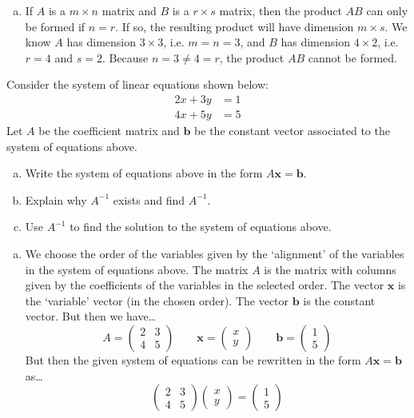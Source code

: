 \documentclass[12pt,letterpaper]{exam}
\begin{document}
\begin{questions}
\begin{enumerate}[(a)]
\item If $A$ is a $m \times n$ matrix and $B$ is a $r \times s$ matrix, then the product $AB$ can only be formed if $n= r$. If so, the resulting product will have dimension $m \times s$. We know $A$ has dimension $3 \times 3$, i.e. $m= n= 3$, and $B$ has dimension $4 \times 2$, i.e. $r= 4$ and $s= 2$. Because $n= 3 \neq 4= r$, the product $AB$ cannot be formed. 
\end{enumerate}



\newpage
\question[10] Consider the system of linear equations shown below:
	\[
	\begin{aligned}
	2x + 3y&= 1 \\
	4x + 5y&= 5
	\end{aligned}
	\]
Let $A$ be the coefficient matrix and $\mathbf{b}$ be the constant vector associated to the system of equations above. 
        \begin{enumerate}[(a)]
        \item Write the system of equations above in the form $A\mathbf{x}= \mathbf{b}$. 
        \item Explain why $A^{-1}$ exists and find $A^{-1}$. 
        \item Use $A^{-1}$ to find the solution to the system of equations above. 
        \end{enumerate} \par\vspace{0.2cm}

\sol 
\begin{enumerate}[(a)]
\item We choose the order of the variables given by the `alignment' of the variables in the system of equations above. The matrix $A$ is the matrix with columns given by the coefficients of the variables in the selected order. The vector $\mathbf{x}$ is the `variable' vector (in the chosen order). The vector $\mathbf{b}$ is the constant vector. But then we have\dots
	\[
	A= \begin{pmatrix} 2 & 3 \\ 4 & 5 \end{pmatrix} \qquad \mathbf{x}= \begin{pmatrix} x \\ y \end{pmatrix} \qquad \mathbf{b}= \begin{pmatrix} 1 \\ 5 \end{pmatrix}
	\]
But then the given system of equations can be rewritten in the form $A\mathbf{x}= \mathbf{b}$ as\dots
	\[
	 \begin{pmatrix} 2 & 3 \\ 4 & 5 \end{pmatrix} \begin{pmatrix} x \\ y \end{pmatrix}= \begin{pmatrix} 1 \\ 5 \end{pmatrix}
	\] \par\vspace{0.2cm}


\end{enumerate}
\end{questions}
\end{document}
